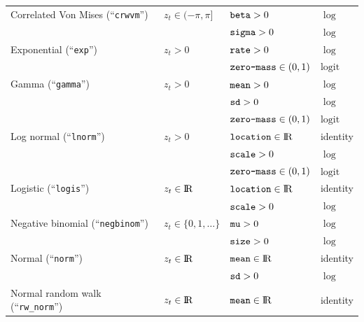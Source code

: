 \documentclass[12pt]{article}\usepackage[]{graphicx}\usepackage[]{xcolor}
\begin{document}
\begin{small}
\begin{table}
\begin{tabular}{llll}
  \rowcolor{Gray} Correlated Von Mises (``\verb|crwvm|'')     & $z_t\in(-\pi,\pi]$            & $\verb|beta|>0$                                 &  $\log$ \tabularnewline  
  \rowcolor{Gray}                             &                               & $\verb|sigma|>0$                                &  $\log$ \tabularnewline  
  Exponential (``\verb|exp|'')                & $z_t>0$                       & $\verb|rate|>0$                                 &  $\log$ \tabularnewline  
                                              &                               & $\verb|zero-mass|\in(0,1)$                      &  $\text{logit}$ \tabularnewline 
  \rowcolor{Gray} Gamma (``\verb|gamma|'')    & $z_t>0$                       & $\verb|mean|>0$                                 &  $\log$ \tabularnewline  
  \rowcolor{Gray}                             &                               & $\verb|sd|>0$                                   &  $\log$ \tabularnewline  
  \rowcolor{Gray}                             &                               & $\verb|zero-mass|\in(0,1)$                      &  $\text{logit}$ \tabularnewline 
  Log normal (``\verb|lnorm|'')               & $z_t>0$                       & $\verb|location|\in{\rm I\!R}$                  &  identity \tabularnewline  
                                              &                               & $\verb|scale|>0$                                &  $\log$ \tabularnewline  
                                              &                               & $\verb|zero-mass|\in(0,1)$                      &  $\text{logit}$ \tabularnewline 
  \rowcolor{Gray} Logistic (``\verb|logis|'') & $z_t\in{\rm I\!R}$            & $\verb|location|\in{\rm I\!R}$                  &  identity \tabularnewline  
  \rowcolor{Gray}                             &                               & $\verb|scale|>0$                                &  $\log$ \tabularnewline                
  Negative binomial (``\verb|negbinom|'')     & $z_t\in\{0,1,\ldots\}$        & $\verb|mu|>0$                                   &  $\log$ \tabularnewline  
                                              &                               & $\verb|size|>0$                                 &  $\log$ \tabularnewline  
  \rowcolor{Gray} Normal (``\verb|norm|'')    & $z_t\in{\rm I\!R}$            & $\verb|mean|\in{\rm I\!R}$                      &  identity \tabularnewline  
  \rowcolor{Gray}                             &                               & $\verb|sd|>0$                                   &  $\log$ \tabularnewline 
  Normal random walk (``\verb|rw_norm|'')     & $z_t\in{\rm I\!R}$            & $\verb|mean|\in{\rm I\!R}$                      &  identity \tabularnewline  

\end{tabular}
\end{table}
\end{small}
\end{document}
